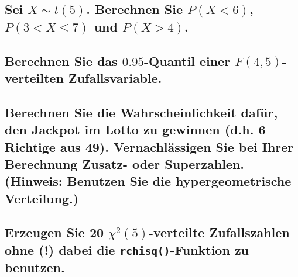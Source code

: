 \documentclass[12pt,a4paper]{article}
\begin{document}
\hypertarget{sei-xsim-t5.-berechnen-sie-px6-p3xleq7-und-px4.}{%
\subsection{\texorpdfstring{Sei \(X\sim t(5)\). Berechnen Sie
\(P(X<6)\), \(P(3<X\leq7)\) und
\(P(X>4)\).}{Sei X\textbackslash sim t(5). Berechnen Sie P(X\textless6), P(3\textless X\textbackslash leq7) und P(X\textgreater4).}}\label{sei-xsim-t5.-berechnen-sie-px6-p3xleq7-und-px4.}}

\hypertarget{berechnen-sie-das-0.95-quantil-einer-f4-5-verteilten-zufallsvariable.}{%
\subsection{\texorpdfstring{Berechnen Sie das \(0.95\)-Quantil einer
\(F(4, 5)\)-verteilten
Zufallsvariable.}{Berechnen Sie das 0.95-Quantil einer F(4, 5)-verteilten Zufallsvariable.}}\label{berechnen-sie-das-0.95-quantil-einer-f4-5-verteilten-zufallsvariable.}}

\hypertarget{berechnen-sie-die-wahrscheinlichkeit-dafuxfcr-den-jackpot-im-lotto-zu-gewinnen-d.h.-6-richtige-aus-49.-vernachluxe4ssigen-sie-bei-ihrer-berechnung-zusatz--oder-superzahlen.-hinweis-benutzen-sie-die-hypergeometrische-verteilung.}{%
\subsection{Berechnen Sie die Wahrscheinlichkeit dafür, den Jackpot im
Lotto zu gewinnen (d.h. 6 Richtige aus 49). Vernachlässigen Sie bei
Ihrer Berechnung Zusatz- oder Superzahlen. (Hinweis: Benutzen Sie die
hypergeometrische
Verteilung.)}\label{berechnen-sie-die-wahrscheinlichkeit-dafuxfcr-den-jackpot-im-lotto-zu-gewinnen-d.h.-6-richtige-aus-49.-vernachluxe4ssigen-sie-bei-ihrer-berechnung-zusatz--oder-superzahlen.-hinweis-benutzen-sie-die-hypergeometrische-verteilung.}}

\hypertarget{erzeugen-sie-20-chi25-verteilte-zufallszahlen-ohne-dabei-die-rchisq-funktion-zu-benutzen.}{%
\subsection{\texorpdfstring{Erzeugen Sie 20 \(\chi^2(5)\)-verteilte
Zufallszahlen ohne (!) dabei die \texttt{rchisq()}-Funktion zu
benutzen.}{Erzeugen Sie 20 \textbackslash chi\^{}2(5)-verteilte Zufallszahlen ohne (!) dabei die rchisq()-Funktion zu benutzen.}}\label{erzeugen-sie-20-chi25-verteilte-zufallszahlen-ohne-dabei-die-rchisq-funktion-zu-benutzen.}}
\end{document}

